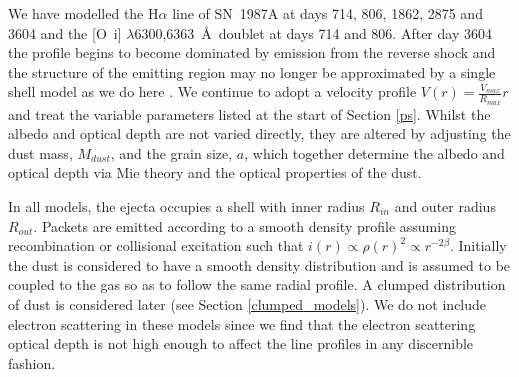 \documentclass[useAMS,usenatbib,usegraphicx]{mnras}
\begin{document}
We have  modelled the H$\alpha$ line of SN~1987A at days 714, 806, 1862, 2875 and 3604 and the 
[O~{\sc i}] $\lambda$6300,6363~\AA\ doublet at days 714 and 806. After day 3604 the profile begins to become dominated by emission from the reverse shock 
and the structure of the emitting region may no longer be approximated by 
a single shell model as we do here \citep{Fransson2013}.  We continue to adopt a velocity profile $V(r) = 
\frac{V_{max}}{R_{max}}r$ and treat the variable parameters listed at the start of 
Section \ref{ps}.  Whilst the albedo and optical depth are not varied 
directly, they are altered by adjusting the dust mass, $M_{dust}$, and the 
grain size, $a$, which together determine the albedo and optical 
depth via  Mie theory and the optical properties of the 
dust.

In all models, the ejecta occupies a shell with inner radius $R_{in}$ and 
outer radius $R_{out}$.  Packets are emitted according to a smooth density 
profile assuming recombination or collisional excitation such that $i(r) \propto \rho(r)^2 \propto 
r^{-2\beta}$.  Initially the dust is considered to have a smooth density 
distribution and is assumed to be coupled to the gas so as to follow the same 
radial profile.  A clumped distribution of dust is considered later (see 
Section \ref{clumped_models}).  We do not include electron scattering in 
these models since we find that the electron scattering optical depth is not high enough to affect the line 
profiles in any discernible fashion.
\end{document}
